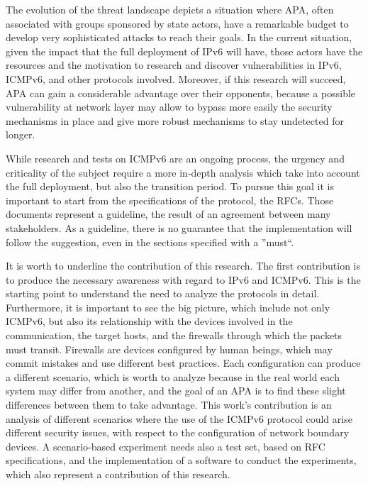 \documentclass[12pt]{article}
\begin{document}
The evolution of the threat landscape depicts a situation where APA, often associated with groups sponsored by state actors, have a remarkable budget to develop very sophisticated attacks to reach their goals. In the current situation, given the impact that the full deployment of IPv6 will have, those actors have the resources and the motivation to research and discover vulnerabilities in IPv6, ICMPv6, and other protocols involved. 
Moreover, if this research will succeed, APA can gain a considerable advantage over their opponents, because a possible vulnerability at network layer may allow to bypass more easily the security mechanisms in place and give more robust mechanisms to stay undetected for longer.

While research and tests on ICMPv6 are an ongoing process, the urgency and criticality of the subject require a more in-depth analysis which take into account the full deployment, but also the transition period. To pursue this goal it is important to start from the specifications of the protocol, the RFCs. Those documents represent a guideline, the result of an agreement between many stakeholders. As a guideline, there is no guarantee that the implementation will follow the suggestion, even in the sections specified with a ''must``.

It is worth to underline the contribution of this research. The first contribution is to produce the necessary awareness with regard to IPv6 and ICMPv6. This is the starting point to understand the need to analyze the protocols in detail. Furthermore, it is important to see the big picture, which include not only ICMPv6, but also its relationship with the devices involved in the communication, the target hosts, and the firewalls through which the packets must transit. Firewalls are devices configured by human beings, which may commit mistakes and use different best practices. Each configuration can produce a different scenario, which is worth to analyze because in the real world each system may differ from another, and the goal of an APA is to find these slight differences between them to take advantage. This work's contribution is an analysis of different scenarios where the use of the ICMPv6 protocol could arise different security issues, with respect to the configuration of network boundary devices. A scenario-based experiment needs also a test set, based on RFC specifications, and the implementation of a software to conduct the experiments, which also represent a contribution of this research.
\end{document}
